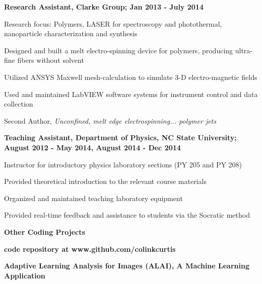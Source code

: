 \documentclass[letterpaper,final]{memoir}
\newcommand{\LargeSep}{\vspace{1.3em}}
\newcommand{\Sep}{\vspace{1.0em}}
\newcommand{\SmallSep}{\vspace{0.4em}}
\newcommand{\CVSection}[1]
	{\LARGE\textbf{#1}\par
	\SmallSep\normalsize}
\newcommand{\CVItem}[1]
	{\textbf{\color{Blue} #1}}
\begin{document}
\Sep

\CVItem{Research Assistant, Clarke Group; Jan 2013 - July 2014}
\begin{compactitem}[\color{Blue}$\circ$]
    
    \SmallSep

    \item Research focus: Polymers, LASER for spectroscopy and photothermal, nanoparticle characterization and synthesis
    \item Designed and built a melt electro-spinning device for polymers, producing ultra-fine fibers without solvent
    \item Utilized ANSYS Maxwell mesh-calculation to simulate 3-D electro-magnetic fields
    \item Used and maintained LabVIEW software systems for instrument control and data collection
    \item Second Author, \textit{Unconfined, melt edge electrospinning... polymer jets}

\end{compactitem}

\Sep

\CVItem{Teaching Assistant, Department of Physics, NC State University; August 2012 - May 2014, August 2014 - Dec 2014}
\begin{compactitem}[\color{Blue}$\circ$]

    \SmallSep
	
    \item Instructor for introductory physics laboratory sections (PY 205 and PY 208)
    \item Provided theoretical introduction to the relevant course materials
    \item Organized and maintained teaching laboratory equipment
    \item Provided real-time feedback and assistance to students via the Socratic method
\end{compactitem}

\LargeSep


\notoserif \CVSection{Other Coding Projects}

\normalfont

\Sep

\CVItem{code repository at www.github.com/colinkcurtis} 

\Sep

\CVItem{Adaptive Learning Analysis for Images (ALAI), A Machine Learning Application} 
\end{document}
